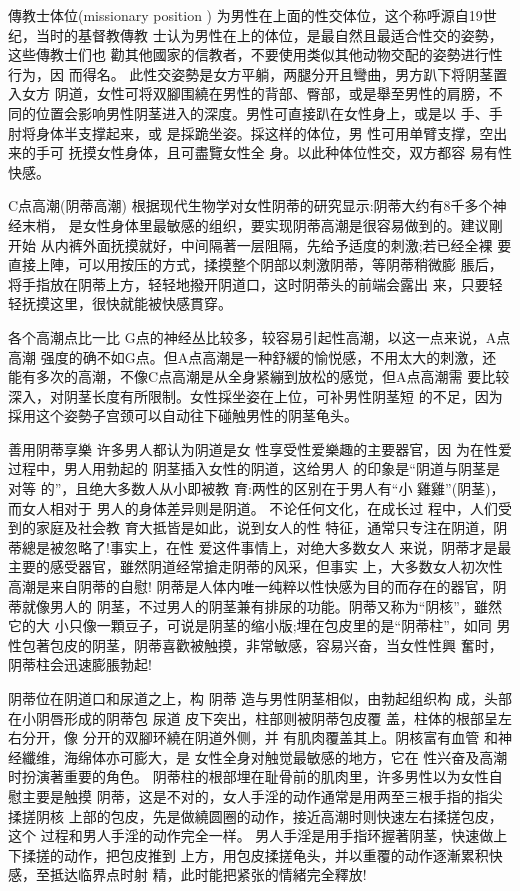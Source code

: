 \documentclass[12pt,UTF8]{ctexbook}
\begin{document}
傳教士体位(missionary position )
为男性在上面的性交体位，这个称呼源自19世纪，当时的基督教傳教
士认为男性在上的体位，是最自然且最适合性交的姿勢，这些傳教士们也
勸其他國家的信教者，不要使用类似其他动物交配的姿勢进行性行为，因
而得名。
此性交姿勢是女方平躺，两腿分开且彎曲，男方趴下将阴茎置入女方
阴道，女性可将双腳围繞在男性的背部、臀部，或是舉至男性的肩膀，不
同的位置会影响男性阴茎进入的深度。男性可直接趴在女性身上，或是以
手、手肘将身体半支撑起来，或
是採跪坐姿。採这样的体位，男
性可用单臂支撑，空出来的手可
抚摸女性身体，且可盡覽女性全
身。以此种体位性交，双方都容
易有性快感。

C点高潮(阴蒂高潮)
根据现代生物学对女性阴蒂的研究显示:阴蒂大约有8千多个神经末梢，
是女性身体里最敏感的组织，要实现阴蒂高潮是很容易做到的。建议剛开始
从内裤外面抚摸就好，中间隔著一层阻隔，先给予适度的刺激;若已经全裸
要直接上陣，可以用按压的方式，揉摸整个阴部以刺激阴蒂，等阴蒂稍微膨
脹后，将手指放在阴蒂上方，轻轻地撥开阴道口，这时阴蒂头的前端会露出
来，只要轻轻抚摸这里，很快就能被快感貫穿。

各个高潮点比一比
G点的神经丛比较多，较容易引起性高潮，以这一点来说，A点高潮
强度的确不如G点。但A点高潮是一种舒緩的愉悦感，不用太大的刺激，还
能有多次的高潮，不像C点高潮是从全身紧繃到放松的感觉，但A点高潮需
要比较深入，对阴茎长度有所限制。女性採坐姿在上位，可补男性阴茎短
的不足，因为採用这个姿勢子宫颈可以自动往下碰触男性的阴茎龟头。

善用阴蒂享樂
许多男人都认为阴道是女
性享受性爱樂趣的主要器官，因
为在性爱过程中，男人用勃起的
阴茎插入女性的阴道，这给男人
的印象是“阴道与阴茎是对等
的”，且绝大多数人从小即被教
育:两性的区别在于男人有“小
雞雞”(阴茎)，而女人相对于
男人的身体差异则是阴道。
不论任何文化，在成长过
程中，人们受到的家庭及社会教
育大抵皆是如此，说到女人的性
特征，通常只专注在阴道，阴蒂總是被忽略了!事实上，在性
爱这件事情上，对绝大多数女人
来说，阴蒂才是最主要的感受器官，雖然阴道经常搶走阴蒂的风采，但事实
上，大多数女人初次性高潮是来自阴蒂的自慰!
阴蒂是人体内唯一纯粹以性快感为目的而存在的器官，阴蒂就像男人的
阴茎，不过男人的阴茎兼有排尿的功能。阴蒂又称为“阴核”，雖然它的大
小只像一顆豆子，可说是阴茎的缩小版;埋在包皮里的是“阴蒂柱”，如同
男性包著包皮的阴茎，阴蒂喜歡被触摸，非常敏感，容易兴奋，当女性性興
奮时，阴蒂柱会迅速膨脹勃起!

阴蒂位在阴道口和尿道之上，构
阴蒂
造与男性阴茎相似，由勃起组织构
成，头部在小阴唇形成的阴蒂包
尿道
皮下突出，柱部则被阴蒂包皮覆
盖，柱体的根部呈左右分开，像
分开的双腳环繞在阴道外侧，并
有肌肉覆盖其上。阴核富有血管
和神经纖维，海绵体亦可膨大，是
女性全身对触觉最敏感的地方，它在
性兴奋及高潮时扮演著重要的角色。
阴蒂柱的根部埋在耻骨前的肌肉里，许多男性以为女性自慰主要是触摸
阴蒂，这是不对的，女人手淫的动作通常是用两至三根手指的指尖揉搓阴核
上部的包皮，先是做繞圆圈的动作，接近高潮时则快速左右揉搓包皮，这个
过程和男人手淫的动作完全一样。
男人手淫是用手指环握著阴茎，快速做上下揉搓的动作，把包皮推到
上方，用包皮揉搓龟头，并以重覆的动作逐漸累积快感，至抵达临界点时射
精，此时能把紧张的情緒完全釋放!
\end{document}
